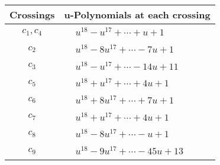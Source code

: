 \documentclass[1p]{elsarticle_modified}
\theoremstyle{definition}
\begin{document}
\begin{tabular}{m{50pt}|m{274pt}}
Crossings & \hspace{64pt}u-Polynomials at each crossing \\
\hline $$\begin{aligned}c_{1},c_{4}\end{aligned}$$&$\begin{aligned}
&u^{18}- u^{17}+\cdots+u+1
\end{aligned}$\\
\hline $$\begin{aligned}c_{2}\end{aligned}$$&$\begin{aligned}
&u^{18}-8 u^{17}+\cdots-7 u+1
\end{aligned}$\\
\hline $$\begin{aligned}c_{3}\end{aligned}$$&$\begin{aligned}
&u^{18}- u^{17}+\cdots-14 u+11
\end{aligned}$\\
\hline $$\begin{aligned}c_{5}\end{aligned}$$&$\begin{aligned}
&u^{18}+u^{17}+\cdots+4 u+1
\end{aligned}$\\
\hline $$\begin{aligned}c_{6}\end{aligned}$$&$\begin{aligned}
&u^{18}+8 u^{17}+\cdots+7 u+1
\end{aligned}$\\
\hline $$\begin{aligned}c_{7}\end{aligned}$$&$\begin{aligned}
&u^{18}+u^{17}+\cdots+4 u+1
\end{aligned}$\\
\hline $$\begin{aligned}c_{8}\end{aligned}$$&$\begin{aligned}
&u^{18}-8 u^{17}+\cdots- u+1
\end{aligned}$\\
\hline $$\begin{aligned}c_{9}\end{aligned}$$&$\begin{aligned}
&u^{18}-9 u^{17}+\cdots-45 u+13
\end{aligned}$\\

\end{tabular}
\end{document}
